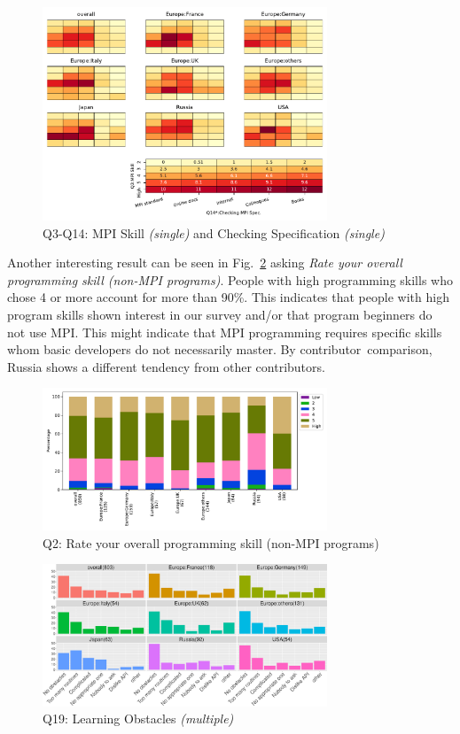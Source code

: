 \documentclass[preprint,5p,times]{elsarticle}
\def\myquote#1{{\it #1}}
\def\country{contributor}%
\def\countries{contributors}%
\begin{document}
\begin{figure}[htb]
\begin{center}
\includegraphics[width=8.5cm]{Figs/Q3-Q14.pdf}
\caption{Q3-Q14: MPI Skill {\it(single)} and Checking Specification {\it(single)}}
\label{fig:reading-standard-and-checking-spec}
\end{center}
\end{figure}

Another interesting result can be seen in Fig.~\ref{fig:prog-skill}
asking \myquote{Rate your overall programming skill (non-MPI
  programs)}. People with high programming skills who chose 4 or more
account for more than 90\%. This indicates that
people with high program skills shown interest in our survey and/or
that program beginners do not use MPI. This might indicate that MPI
programming requires specific skills whom basic developers do not
necessarily master. By \country\  comparison, Russia shows a different
tendency from other \countries.

\begin{figure}[htb]
\begin{center}
\includegraphics[width=8.5cm]{Figs/Q2.pdf}
\caption{Q2: Rate your overall programming skill (non-MPI
  programs)}
\label{fig:prog-skill}
\end{center}
\end{figure}

\begin{figure}[htb]
\begin{center}
\includegraphics[width=8.5cm]{R-scripts/Q19.pdf}
\caption{Q19: Learning Obstacles {\it(multiple)}}
\label{fig:learning-obstacles}
\end{center}
\end{figure}
\end{document}
